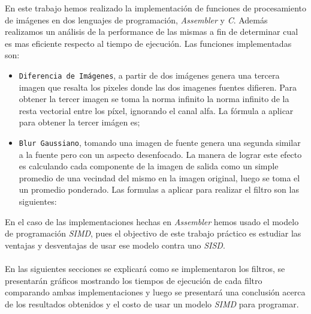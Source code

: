 \indent En este trabajo hemos realizado la implementaci\'on de funciones de procesamiento de im\'agenes en dos lenguajes de programaci\'on, \emph{Assembler} y \emph{C}. Adem\'as realizamos un an\'alisis de la performance de las mismas a fin de determinar cual es mas eficiente respecto al tiempo de ejecuci\'on. Las funciones implementadas son: \\

\begin{itemize}
	\item \texttt{Diferencia de Im\'agenes}, a partir de dos im\'agenes genera una tercera imagen que resalta los pixeles donde las dos imagenes fuentes difieren. Para obtener la tercer imagen se toma la norma infinito la norma infinito de la resta vectorial entre los píxel, ignorando el canal alfa. La f\'ormula a aplicar para obtener la tercer im\'agen es;


	\item \texttt{Blur Gaussiano}, tomando una imagen de fuente genera una segunda similar a la fuente pero con un aspecto desenfocado. La manera de lograr este efecto es calculando cada componente de la imagen de salida como un simple
promedio de una vecindad del mismo en la imagen original, luego se toma el un promedio ponderado. Las formulas a aplicar para realizar el filtro son las siguientes:




\end{itemize}

\indent En el caso de las implementaciones hechas en \textit{Assembler} hemos usado el modelo de programaci\'on \textit{SIMD}, pues el objectivo de este trabajo pr\'actico es estudiar las ventajas y desventajas de usar ese modelo contra uno \textit{SISD}.\\ \\
\indent En las siguientes secciones se explicar\'a como se implementaron los filtros, se presentar\'an gr\'aficos mostrando los tiempos de ejecuci\'on de cada filtro comparando ambas implementaciones y luego se presentar\'a una conclusi\'on acerca de los resultados obtenidos y el costo de usar un modelo \textit{SIMD} para programar.

